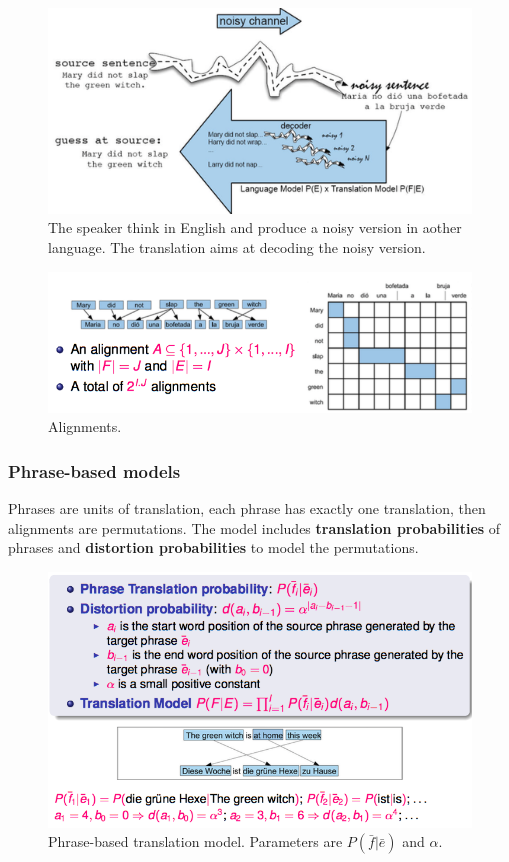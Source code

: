 \begin{figure}[H]
	\centering
	\includegraphics[scale=0.6]{images/61_noisy.png}
 	\caption{The speaker think in English and produce a  noisy version in aother language. The translation aims at decoding the noisy version.}
\end{figure}


\begin{figure}[H]
	\centering
	\includegraphics[scale=0.6]{images/62_ali.png}
 	\caption{Alignments.}
\end{figure}

\subsubsection{Phrase-based models}

Phrases are units of translation, each phrase has exactly one translation, then alignments are permutations. The model includes \textbf{translation probabilities} of phrases and \textbf{distortion probabilities} to model the permutations.

\begin{figure}[H]
	\centering
	\includegraphics[scale=0.6]{images/63_phrase.png}
 	\caption{Phrase-based translation model. Parameters are $P(\bar{f}|\bar{e})$ and $\alpha$.}
\end{figure}

